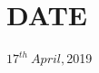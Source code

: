 \documentclass[margin]{res}
\begin{document}
    \section{DATE}
    {$17^{th} \ April, $2019}

\(\)
\end{document}
